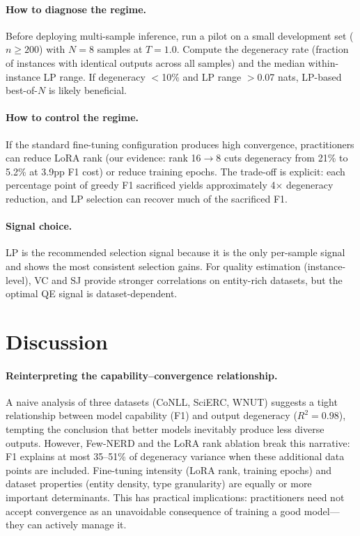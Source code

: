 \documentclass[11pt,a4paper]{article}
\begin{document}
\paragraph{How to diagnose the regime.}
Before deploying multi-sample inference, run a pilot on a small development set ($n \ge 200$) with $N{=}8$ samples at $T{=}1.0$.
Compute the degeneracy rate (fraction of instances with identical outputs across all samples) and the median within-instance LP range.
If degeneracy $<$10\% and LP range $>$0.07 nats, LP-based best-of-$N$ is likely beneficial.

\paragraph{How to control the regime.}
If the standard fine-tuning configuration produces high convergence, practitioners can reduce LoRA rank (our evidence: rank 16$\to$8 cuts degeneracy from 21\% to 5.2\% at 3.9pp F1 cost) or reduce training epochs.
The trade-off is explicit: each percentage point of greedy F1 sacrificed yields approximately 4$\times$ degeneracy reduction, and LP selection can recover much of the sacrificed F1.

\paragraph{Signal choice.}
LP is the recommended selection signal because it is the only per-sample signal and shows the most consistent selection gains.
For quality estimation (instance-level), VC and SJ provide stronger correlations on entity-rich datasets, but the optimal QE signal is dataset-dependent.

\section{Discussion}

\paragraph{Reinterpreting the capability--convergence relationship.}
A naive analysis of three datasets (CoNLL, SciERC, WNUT) suggests a tight relationship between model capability (F1) and output degeneracy ($R^2{=}0.98$), tempting the conclusion that better models inevitably produce less diverse outputs.
However, Few-NERD and the LoRA rank ablation break this narrative: F1 explains at most 35--51\% of degeneracy variance when these additional data points are included.
Fine-tuning intensity (LoRA rank, training epochs) and dataset properties (entity density, type granularity) are equally or more important determinants.
This has practical implications: practitioners need not accept convergence as an unavoidable consequence of training a good model---they can actively manage it.
\end{document}
